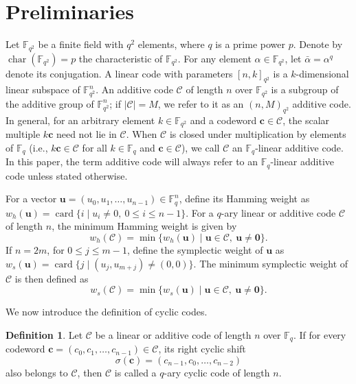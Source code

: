 \documentclass{aims}
\numberwithin{equation}{section}
\theoremstyle{definition}
\newtheorem{definition}[theorem]{Definition}
\newcommand{\F}{\mathbb{F}}
\newcommand{\card}{\operatorname{card}}
\newcommand{\charac}{\operatorname{char}}
\begin{document}
\section{Preliminaries}\label{sec:prelim}
Let $\F_{q^{2}}$ be a finite field with $q^{2}$ elements, where $q$ is a prime power $p$. Denote by $\charac(\F_{q^{2}}) = p$ the characteristic of $\F_{q^{2}}$. For any element $\alpha \in \F_{q^{2}}$, let $\bar{\alpha} = \alpha^{q}$ denote its conjugation. A linear code with parameters $[n,k]_{q^{2}}$ is a $k$-dimensional linear subspace of $\F_{q^{2}}^{n}$. An additive code $\mathcal{C}$ of length $n$ over $\F_{q^{2}}$ is a subgroup of the additive group of $\F_{q^{2}}^{n}$; if $|\mathcal{C}| = M$, we refer to it as an $(n,M)_{q^{2}}$ additive code. In general, for an arbitrary element $k \in \F_{q^{2}}$ and a codeword $\mathbf{c} \in \mathcal{C}$, the scalar multiple $k\mathbf{c}$ need not lie in $\mathcal{C}$. When $\mathcal{C}$ is closed under multiplication by elements of $\F_{q}$ (i.e., $k\mathbf{c} \in \mathcal{C}$ for all $k \in \F_{q}$ and $\mathbf{c} \in \mathcal{C}$), we call $\mathcal{C}$ an $\F_{q}$-linear additive code. In this paper, the term additive code will always refer to an $\F_{q}$-linear additive code unless stated otherwise.

For a vector $\pmb{u} = (u_0, u_1, \ldots, u_{n-1}) \in \F_q^n$, define its Hamming weight as $w_h(\pmb{u}) = \card\{i \mid u_i \neq 0,\ 0 \le i \le n-1\}$. For a $q$-ary linear or additive code $\mathcal{C}$ of length $n$, the minimum Hamming weight is given by
\[
w_h(\mathcal{C}) = \min \{ w_h(\pmb{u}) \mid \pmb{u} \in \mathcal{C},\ \pmb{u} \neq \mathbf{0} \}.
\]
If $n = 2m$, for $0 \le j \le m-1$, define the symplectic weight of $\pmb{u}$ as $w_s(\pmb{u}) = \card\{j \mid (u_j, u_{m+j}) \neq (0,0)\}$. The minimum symplectic weight of $\mathcal{C}$ is then defined as
\[
w_s(\mathcal{C}) = \min \{ w_s(\pmb{u}) \mid \pmb{u} \in \mathcal{C},\ \pmb{u} \neq \mathbf{0} \}.
\]

We now introduce the definition of cyclic codes.

\begin{definition}\label{def:cyclic}
	Let $\mathcal{C}$ be a linear or additive code of length $n$ over $\F_q$. If for every codeword $\mathbf{c} = (c_0, c_1, \ldots, c_{n-1}) \in \mathcal{C}$, its right cyclic shift
	\begin{equation}\label{eq111xx}
		\sigma(\mathbf{c}) = (c_{n-1}, c_0, \ldots, c_{n-2})
	\end{equation}
 also belongs to $\mathcal{C}$, then $\mathcal{C}$ is called a $q$-ary cyclic code of length $n$.
\end{definition}
\end{document}
